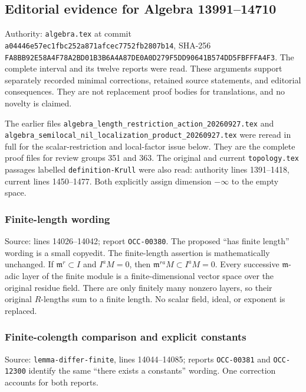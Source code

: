 \subsection{Editorial evidence for Algebra 13991--14710}\label{algebra-proof-003-editorial-evidence-for-algebra-1399114710}

Authority: \texttt{algebra.tex} at commit \texttt{a04446e57ec1fbc252a871afcec7752fb2807b14}, SHA-256 \texttt{FA8BB92E58A4F78A2BD01B3B6A4A87DE0A0D279F5DD90641B574DD5FBFFFA4F3}. The complete interval and its twelve reports were read. These arguments support separately recorded minimal corrections, retained source statements, and editorial consequences. They are not replacement proof bodies for translations, and no novelty is claimed.

The earlier files \texttt{algebra\_length\_restriction\_action\_20260927.tex} and \texttt{algebra\_semilocal\_nil\_localization\_product\_20260927.tex} were reread in full for the scalar-restriction and local-factor issue below. They are the complete proof files for review groups 351 and 363. The original and current \texttt{topology.tex} passages labelled \texttt{definition-Krull} were also read: authority lines 1391--1418, current lines 1450--1477. Both explicitly assign dimension \(-\infty\) to the empty space.

\subsubsection{Finite-length wording}\label{algebra-proof-003-finite-length-wording}

Source: lines 14026--14042; report \texttt{OCC-00380}. The proposed ``has finite length'' wording is a small copyedit. The finite-length assertion is mathematically unchanged. If \(\mathfrak m^r\subset I\) and \(I^aM=0\), then \(\mathfrak m^{ra}M\subset I^aM=0\). Every successive \(\mathfrak m\)-adic layer of the finite module is a finite-dimensional vector space over the original residue field. There are only finitely many nonzero layers, so their original \(R\)-lengths sum to a finite length. No scalar field, ideal, or exponent is replaced.

\subsubsection{Finite-colength comparison and explicit constants}\label{algebra-proof-003-finite-colength-comparison-and-explicit-constants}

Source: \texttt{lemma-differ-finite}, lines 14044--14085; reports \texttt{OCC-00381} and \texttt{OCC-12300} identify the same ``there exists a constants'' wording. One correction accounts for both reports.

